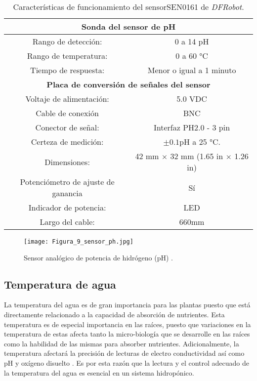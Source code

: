 \begin{table}[H]
	\centering
	\begin{tabular}{|c|c|}
		\hline
		\multicolumn{2}{|c|}{\textbf{Sonda del sensor de pH}}\\ \hline
		Rango de detección: & 0 a 14 pH \\ \hline
		Rango de temperatura: & 0 a 60 °C \\ \hline
		Tiempo de respuesta: & Menor o igual a 1 minuto \\ \hline
		\multicolumn{2}{|c|}{\textbf{Placa de conversión de señales del sensor}}\\ \hline 
		Voltaje de alimentación: & 5.0 VDC \\ \hline
		Cable de conexión & BNC \\ \hline
		Conector de señal: & Interfaz PH2.0 - 3 pin \\ \hline
		Certeza de medición: & $\pm 0.1$pH a 25 °C. \\ \hline
		Dimensiones: & 42 mm $\times$ 32 mm (1.65 in $\times$ 1.26 in) \\ \hline
		Potenciómetro de ajuste de ganancia & Sí \\ \hline
		Indicador de potencia: & LED \\ \hline
		Largo del cable: & 660mm \\ \hline
	\end{tabular}
	\caption{Características de funcionamiento del sensorSEN0161 de \textit{DFRobot}.}
	\label{Cuadro3}
\end{table}

\begin{figure}[H]
	\centering
	\texttt{[image: Figura\_9\_sensor\_ph.jpg]}
	\caption{Sensor analógico de potencia de hidrógeno (pH) \cite{DFRobot_PHsensor}.}
	\label{fig:mesh9}
\end{figure}

\subsection{Temperatura de agua}
La temperatura del agua es de gran importancia para las plantas puesto que está directamente relacionado a la capacidad de absorción de nutrientes. Esta temperatura es de especial importancia en las raíces, puesto que variaciones en la temperatura de estas afecta tanto la micro-biología que se desarrolle en las raíces como la habilidad de las mismas para absorber nutrientes. Adicionalmente, la temperatura afectará la precisión de lecturas de electro conductividad así como pH y oxígeno disuelto \cite{voogt_nutrient_2019}. Es por esta razón que la lectura y el control adecuado de la temperatura del agua es esencial en un sistema hidropónico. 

